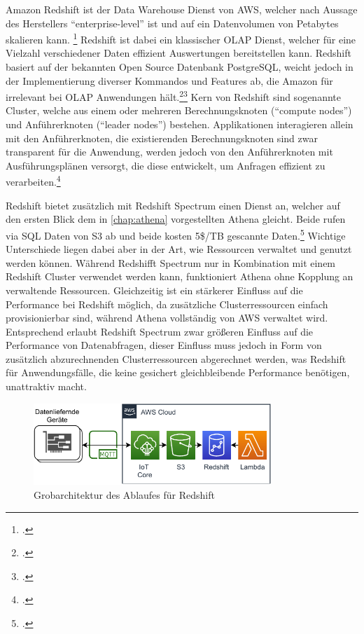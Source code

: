 Amazon Redshift ist der Data Warehouse Dienst von \ac{AWS}, welcher nach Aussage des Herstellers \enquote{enterprise-level} ist und auf ein Datenvolumen von Petabytes skalieren kann. \footcite[Vgl.][1]{AmazonWebServicesInc..o.J.g} Redshift ist dabei ein klassischer \ac{OLAP} Dienst, welcher für eine Vielzahl verschiedener Daten effizient Auswertungen bereitstellen kann. Redshift basiert auf der bekannten Open Source Datenbank PostgreSQL, weicht jedoch in der Implementierung diverser Kommandos und Features ab, die Amazon für irrelevant bei \ac{OLAP} Anwendungen hält.\footcite[Vgl.][4]{AmazonWebServicesInc..o.J.g}\nzitat\footcite[Vgl.][428\psqq]{AmazonWebServicesInc..o.J.g} Kern von Redshift sind sogenannte Cluster, welche aus einem oder mehreren Berechnungsknoten (\enquote{compute nodes}) und Anführerknoten (\enquote{leader nodes}) bestehen. Applikationen interagieren allein mit den Anführerknoten, die existierenden Berechnungsknoten sind zwar transparent für die Anwendung, werden jedoch von den Anführerknoten mit Ausführungsplänen versorgt, die diese entwickelt, um Anfragen effizient zu verarbeiten.\footcite[Vgl.][4]{AmazonWebServicesInc..o.J.g}

Redshift bietet zusätzlich mit Redshift Spectrum einen Dienst an, welcher auf den ersten Blick dem in \autoref{chap:athena} vorgestellten Athena gleicht. Beide rufen via \ac{SQL} Daten von \ac{S3} ab und beide kosten 5\$/TB gescannte Daten.\footcite[Vgl. auch im Folgenden][]{Smallcombe.2020} Wichtige Unterschiede liegen dabei aber in der Art, wie Ressourcen verwaltet und genutzt werden können. Während Redshifft Spectrum nur in Kombination mit einem Redshift Cluster verwendet werden kann, funktioniert Athena ohne Kopplung an verwaltende Ressourcen. Gleichzeitig ist ein stärkerer Einfluss auf die Performance bei Redshift möglich, da zusätzliche Clusterressourcen einfach provisionierbar sind, während Athena vollständig von \ac{AWS} verwaltet wird. Entsprechend erlaubt Redshift Spectrum zwar größeren Einfluss auf die Performance von Datenabfragen, dieser Einfluss muss jedoch in Form von zusätzlich abzurechnenden Clusterressourcen abgerechnet werden, was Redshift für Anwendungsfälle, die keine gesichert gleichbleibende Performance benötigen, unattraktiv macht.

\begin{figure}[H]
\centering
\includegraphics[width=0.8\textwidth]{graphics/Redshift-general.pdf}
\caption{Grobarchitektur des Ablaufes für Redshift}
\label{abb:GrobArchitekturRedshift}
\end{figure}

